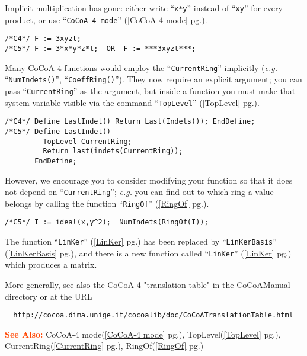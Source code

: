 \documentclass[a4paper]{mybook}
\newcommand\SeeAlso{\par\textcolor{OrangeRed}{\textbf{\large See Also: }}}
\begin{document}
Implicit multiplication has gone: either write ``\verb&x*y&'' instead of ``\verb&xy&''
for every product, or use ``\verb&CoCoA-4 mode&'' (\ref{CoCoA-4 mode} pg.\pageref{CoCoA-4 mode}).
\begin{Verbatim}[label=example, rulecolor=\color{PineGreen}, frame=single]
/*C4*/ F := 3xyzt;
/*C5*/ F := 3*x*y*z*t;  OR  F := ***3xyzt***;
\end{Verbatim}

Many CoCoA-4 functions would employ the ``\verb&CurrentRing&'' implicitly (\textit{e.g.}
``\verb&NumIndets()&'', ``\verb&CoeffRing()&'').  They now require an explicit argument;
you can pass ``\verb&CurrentRing&'' as the argument, but inside a function you must
make that system variable visible via the command ``\verb&TopLevel&'' (\ref{TopLevel} pg.\pageref{TopLevel}).
\begin{Verbatim}[label=example, rulecolor=\color{PineGreen}, frame=single]
/*C4*/ Define LastIndet() Return Last(Indets()); EndDefine;
/*C5*/ Define LastIndet()
         TopLevel CurrentRing;
         Return last(indets(CurrentRing));
       EndDefine;
\end{Verbatim}

However, we encourage you to consider modifying your function so that
it does not depend on ``\verb&CurrentRing&''; \textit{e.g.} you can find
out to which ring a value belongs by calling the function ``\verb&RingOf&'' (\ref{RingOf} pg.\pageref{RingOf}).
\begin{Verbatim}[label=example, rulecolor=\color{PineGreen}, frame=single]
/*C5*/ I := ideal(x,y^2);  NumIndets(RingOf(I));
\end{Verbatim}

The function ``\verb&LinKer&'' (\ref{LinKer} pg.\pageref{LinKer}) has been replaced by ``\verb&LinKerBasis&'' (\ref{LinKerBasis} pg.\pageref{LinKerBasis}),
and there is a new function called ``\verb&LinKer&'' (\ref{LinKer} pg.\pageref{LinKer}) which produces a matrix.
\par 
More generally, see also the CoCoA-4 "translation table" in the
CoCoAManual directory or at the URL
\begin{verbatim}
  http://cocoa.dima.unige.it/cocoalib/doc/CoCoATranslationTable.html
\end{verbatim}

\SeeAlso %
  CoCoA-4 mode(\ref{CoCoA-4 mode} pg.\pageref{CoCoA-4 mode}), 
    TopLevel(\ref{TopLevel} pg.\pageref{TopLevel}), 
    CurrentRing(\ref{CurrentRing} pg.\pageref{CurrentRing}), 
    RingOf(\ref{RingOf} pg.\pageref{RingOf})
\end{document}
